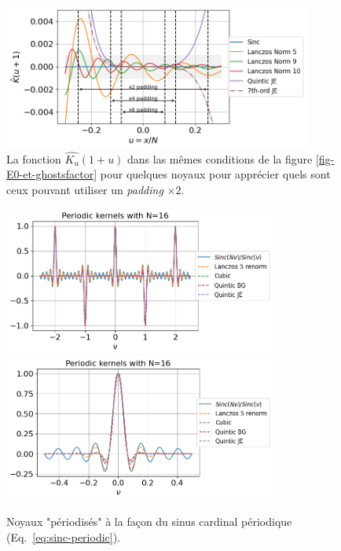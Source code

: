 \documentclass[11pt,twoside]{article}
\begin{document}
\begin{figure}
\centering
\includegraphics[width=0.9\textwidth]{fig17.png}
\caption{La fonction $\widehat{K_u}(1+u)$ dans las mêmes conditions de la figure \ref{fig-E0-et-ghostsfactor} pour quelques noyaux pour apprécier quels sont ceux pouvant utiliser un \textit{padding} $\times 2$.}
\label{fig-ghostsfactor-large-support-kernels}
\end{figure}

%
\begin{figure}
\centering
\includegraphics[width=0.8\textwidth]{fig18a.png}
\includegraphics[width=0.8\textwidth]{fig18b.png}
\caption{Noyaux "périodisés" à la façon du sinus cardinal périodique (Eq.~\ref{eq:sinc-periodic}).}
\label{fig-periodized-kernels}
\end{figure}
%
\end{document}
